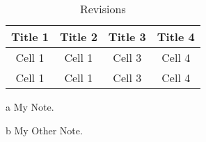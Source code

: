 \documentclass[10pt,a4paper]{article}
\begin{document}
\blindtext
\blindtext

    \begin{table}[ht]
    \centering
    \caption{Revisions}
     \begin{threeparttable}
    \centering
        \begin{tabular}{cccc}
        \toprule
            Title 1 & Title 2 & Title 3 & Title 4          \\
        \midrule
            Cell 1  & Cell 1  & Cell 3  & Cell 4 \tnote{a} \\
            Cell 1  & Cell 1  & Cell 3  & Cell 4 \tnote{b} \\
        \bottomrule
        \end{tabular}
        \begin{tablenotes}
            \item[a] My Note.
            \item[b] My Other Note.
        \end{tablenotes}
     \end{threeparttable}
    \end{table}
    
\end{document}

